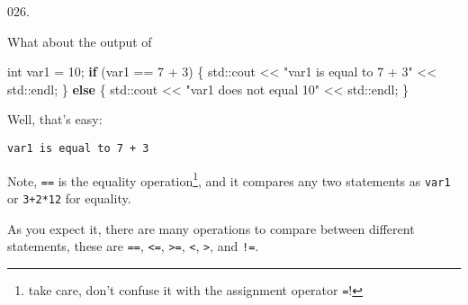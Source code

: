 \documentclass[]{book}
\newenvironment{Shaded}{}{}
\newcommand{\BuiltInTok}[1]{#1}
\newcommand{\ControlFlowTok}[1]{\textcolor[rgb]{0.00,0.44,0.13}{\textbf{#1}}}
\newcommand{\DataTypeTok}[1]{\textcolor[rgb]{0.56,0.13,0.00}{#1}}
\newcommand{\DecValTok}[1]{\textcolor[rgb]{0.25,0.63,0.44}{#1}}
\newcommand{\NormalTok}[1]{#1}
\newcommand{\StringTok}[1]{\textcolor[rgb]{0.25,0.44,0.63}{#1}}
\begin{document}
\begin{minipage}{\linewidth}\noindent
{\tiny 026.}\\
\begin{minipage}[t]{.485\linewidth}

What about the output of

\begin{framed}

\begin{Shaded}
\begin{Highlighting}[]
\DataTypeTok{int}\NormalTok{ var1 = }\DecValTok{10}\NormalTok{;}
\ControlFlowTok{if}\NormalTok{ (var1 == }\DecValTok{7}\NormalTok{ + }\DecValTok{3}\NormalTok{) \{}
  \BuiltInTok{std::}\NormalTok{cout << }\StringTok{"var1 is equal to 7 + 3"}
\NormalTok{            << }\BuiltInTok{std::}\NormalTok{endl;}
\NormalTok{\} }\ControlFlowTok{else}\NormalTok{ \{}
  \BuiltInTok{std::}\NormalTok{cout << }\StringTok{"var1 does not equal 10"}
\NormalTok{    << }\BuiltInTok{std::}\NormalTok{endl;}
\NormalTok{\}}
\end{Highlighting}
\end{Shaded}

\end{framed}

\end{minipage}
\hfill
\begin{minipage}[t]{.485\linewidth}

Well, that's easy:

\begin{framed}

\begin{verbatim}
var1 is equal to 7 + 3
\end{verbatim}

\end{framed}

Note, \texttt{==} is the equality operation\footnote{take care, don't
  confuse it with the assignment operator \texttt{=}!}, and it compares
any two statements as \texttt{var1} or \texttt{3+2*12} for equality.

As you expect it, there are many operations to compare between different
statements, these are \texttt{==}, \texttt{\textless{}=},
\texttt{\textgreater{}=}, \texttt{\textless{}}, \texttt{\textgreater{}},
and \texttt{!=}.

\end{minipage}
\end{minipage}

\vspace{2mm}\noindent\hrulefill{}
\end{document}
